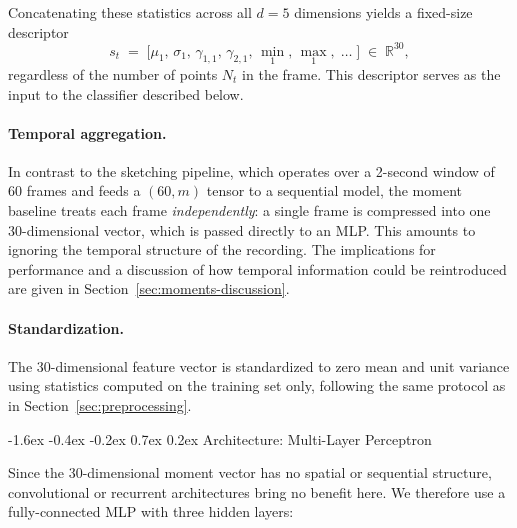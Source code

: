 \documentclass[10pt,twocolumn]{article}
\makeatletter
\renewcommand{\subsection}{%
  \@startsection{subsection}{2}{\z@}%
  {-1.6ex \@plus -0.4ex \@minus -0.2ex}%
  {0.7ex \@plus 0.2ex}%
  {\normalfont\normalsize\bfseries}}
\makeatother
\begin{document}
\noindent Concatenating these statistics across all $d = 5$ dimensions yields a
fixed-size descriptor
\[
s_t \;=\; \bigl[\mu_1,\,\sigma_1,\,\gamma_{1,1},\,\gamma_{2,1},\,
               \min_1,\,\max_1,\;\ldots\;\bigr] \;\in\; \mathbb{R}^{30},
\]
regardless of the number of points $N_t$ in the frame. This descriptor serves
as the input to the classifier described below.

\paragraph{Temporal aggregation.}
In contrast to the sketching pipeline, which operates over a 2-second window of
60 frames and feeds a $(60, m)$ tensor to a sequential model, the moment
baseline treats each frame \emph{independently}: a single frame is compressed
into one 30-dimensional vector, which is passed directly to an MLP. This
amounts to ignoring the temporal structure of the recording. The implications
for performance and a discussion of how temporal information could be
reintroduced are given in Section~\ref{sec:moments-discussion}.

\paragraph{Standardization.}
The 30-dimensional feature vector is standardized to zero mean and unit
variance using statistics computed on the training set only, following the
same protocol as in Section~\ref{sec:preprocessing}.

\subsection{Architecture: Multi-Layer Perceptron}

Since the 30-dimensional moment vector has no spatial or sequential structure,
convolutional or recurrent architectures bring no benefit here. We therefore use
a fully-connected MLP with three hidden layers:

\begin{table}[H]
\centering
\scriptsize
{}
\caption{MLP architecture used for the moment-based baseline.}
\label{tab:moments-mlp}
\end{table}
\end{document}
